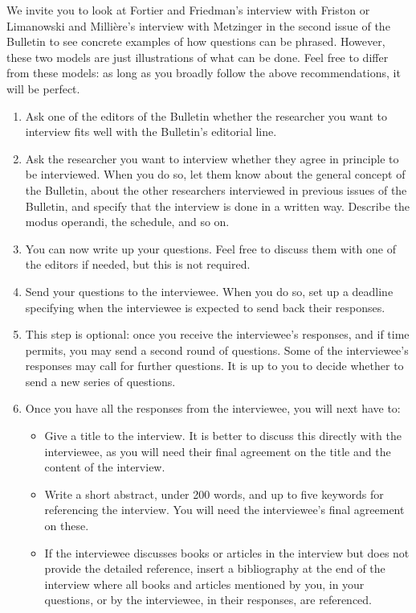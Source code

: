 \documentclass[11pt]{article}
\begin{document}
We invite you to look at Fortier and Friedman's interview with Friston or Limanowski and Milli\`ere's interview with Metzinger in the second issue of the Bulletin to see concrete examples of how questions can be phrased. However, these two models are just illustrations of what can be done. Feel free to differ from these models: as long as you broadly follow the above recommendations, it will be perfect.


\begin{enumerate}
\item Ask one of the editors of the Bulletin whether the researcher you want to interview fits well with the Bulletin's editorial line.
\item Ask the researcher you want to interview whether they agree in principle to be interviewed. When you do so, let them know about the general concept of the Bulletin, about the other researchers interviewed in previous issues of the Bulletin, and specify that the interview is done in a written way. Describe the modus operandi, the schedule, and so on.
\item You can now write up your questions. Feel free to discuss them with one of the editors if needed, but this is not required.
\item Send your questions to the interviewee. When you do so, set up a deadline specifying when the interviewee is expected to send back their responses.
\item This step is optional: once you receive the interviewee's responses, and if time permits, you may send a second round of questions. Some of the interviewee's responses may call for further questions. It is up to you to decide whether to send a new series of questions.
\item Once you have all the responses from the interviewee, you will next have to:
  \begin{itemize}[label=\textendash,leftmargin=1.5em]
  \item Give a title to the interview. It is better to discuss this directly with the interviewee, as you will need their final agreement on the title and the content of the interview.
  \item Write a short abstract, under 200 words, and up to five keywords for referencing the interview. You will need the interviewee's final agreement on these.
  \item If the interviewee discusses books or articles in the interview but does not provide the detailed reference, insert a bibliography at the end of the interview where all books and articles mentioned by you, in your questions, or by the interviewee, in their responses, are referenced.

\end{itemize}
\end{enumerate}
\end{document}
